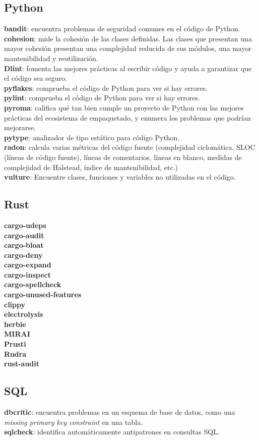\subsection{Python}

\textbf{bandit}: encuentra problemas de seguridad comunes en el código de Python.\\
\textbf{cohesion}: mide la cohesión de las clases definidas. Las clases que presentan una mayor cohesión presentan una complejidad reducida de sus módulos, una mayor mantenibilidad y reutilización.\\
\textbf{Dlint}: fomenta las mejores prácticas al escribir código y ayuda a garantizar que el código sea seguro.\\
\textbf{pyflakes}: comprueba el código de Python para ver si hay errores.\\
\textbf{pylint}: comprueba el código de Python para ver si hay errores.\\
\textbf{pyroma}: califica qué tan bien cumple un proyecto de Python con las mejores prácticas del ecosistema de empaquetado, y enumera los problemas que podrían mejorarse.\\
\textbf{pytype}: analizador de tipo estático para código Python.\\
\textbf{radon}: calcula varias métricas del código fuente (complejidad ciclomática, SLOC (líneas de código fuente), líneas de comentarios, líneas en blanco, medidas de complejidad de Halstead, índice de mantenibilidad, etc.)\\
\textbf{vulture}: Encuentre clases, funciones y variables no utilizadas en el código.

\subsection{Rust}

\textbf{cargo-udeps}\\
\textbf{cargo-audit}\\
\textbf{cargo-bloat}\\
\textbf{cargo-deny}\\
\textbf{cargo-expand}\\
\textbf{cargo-inspect}\\
\textbf{cargo-spellcheck}\\
\textbf{cargo-unused-features}\\
\textbf{clippy}\\
\textbf{electrolysis}\\
\textbf{herbie}\\
\textbf{MIRAI}\\
\textbf{Prusti}\\
\textbf{Rudra}\\
\textbf{rust-audit}

\subsection{SQL}

\textbf{dbcritic}: encuentra problemas en un esquema de base de datos, como una \textit{missing primary key constraint} en una tabla.\\
\textbf{sqlcheck}: identifica automáticamente antipatrones en consultas SQL.\@

\pagebreak
